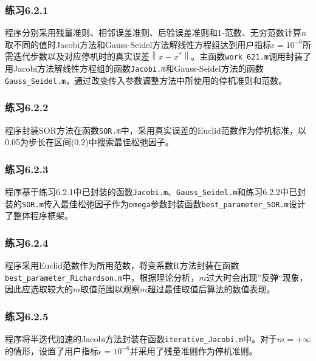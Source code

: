 \documentclass[UTF8,a4paper,10pt]{ctexart}
\begin{document}
            \subsubsection{练习6.2.1}
                \par
                程序分别采用残量准则、相邻误差准则、后验误差准则和1-范数、无穷范数计算$n$取不同的值时Jacobi方法和Gauss-Seidel方法解线性方程组达到用户指标$\epsilon=10^{-6}$所需迭代步数以及对应停机时的真实误差$\left\|x-x^*\right\|$。主函数\texttt{work\_621.m}调用封装了用Jacobi方法解线性方程组的函数\texttt{Jacobi.m}和Gauss-Seidel方法的函数\texttt{Gauss\_Seidel.m}，通过改变传入参数调整方法中所使用的停机准则和范数。
            \subsubsection{练习6.2.2}
                \par
                程序封装SOR方法在函数\texttt{SOR.m}中，采用真实误差的Euclid范数作为停机标准，以0.05为步长在区间(0,2)中搜索最佳松弛因子。
            \subsubsection{练习6.2.3}
                \par
                程序基于练习6.2.1中已封装的函数\texttt{Jacobi.m}、\texttt{Gauss\_Seidel.m}和练习6.2.2中已封装的\texttt{SOR.m}传入最佳松弛因子作为\texttt{omega}参数封装函数\texttt{best\_parameter\_SOR.m}设计了整体程序框架。
            \subsubsection{练习6.2.4}
                \par
                程序采用Euclid范数作为所用范数，将变系数R方法封装在函数\texttt{best\_parameter\_Richardson.m}中，根据理论分析，$m$过大时会出现”反弹“现象，因此应选取较大的$m$取值范围以观察$m$超过最佳取值后算法的数值表现。
            \subsubsection{练习6.2.5}
                \par
                程序将半迭代加速的Jacobi方法封装在函数\texttt{iterative\_Jacobi.m}中。对于$m=+\infty$的情形，设置了用户指标$\epsilon=10^{-6}$并采用了残量准则作为停机准则。
\end{document}
